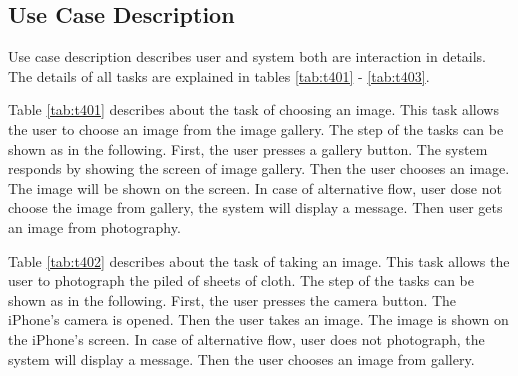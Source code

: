\subsection{Use Case Description}
Use case description describes user and system both are interaction in details. The details of all tasks are explained in tables \ref{tab:t401} - \ref{tab:t403}. 

Table \ref{tab:t401} describes about the task of choosing an image.  This task allows the user to choose an image from the image gallery. The step of the tasks can be shown as in the following. First, the user presses a gallery button. The system responds by showing the screen of image gallery. Then the user chooses an image. The image will be shown on the screen. In case of alternative flow, user dose not choose the image from gallery, the system will display a message. Then user gets an image from photography.

Table \ref{tab:t402} describes about the task of taking an image. This task allows the user to photograph the piled of sheets of cloth. The step of the tasks can be shown as in the following. First, the user presses the camera button. The iPhone’s camera is opened. Then the user takes an image. The image is shown on the iPhone’s screen. In case of alternative flow, user does not photograph, the system will display a message. Then the user chooses an image from gallery. 

